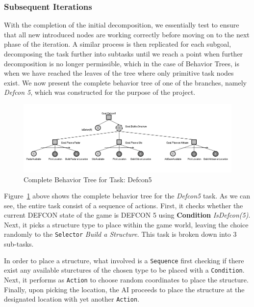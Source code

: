        \subsubsection{Subsequent Iterations}
        
        With the completion of the initial decomposition, we essentially test to ensure that all new introduced nodes are working correctly before moving on to the next phase of the iteration. A similar process is then replicated for each subgoal, decomposing the task further into subtasks until we reach a point when further decomposition is no longer permissible, which in the case of Behavior Trees, is when we have reached the leaves of the tree where only primitive task nodes exist. We now present the complete behavior tree of one of the branches, namely \emph{Defcon 5}, which was constructed for the purpose of the project. 
        
        \pagebreak
        
        \begin{figure}[h]                
            \begin{center}
            \includegraphics[scale=0.45]{images/defcon5.png}
            \caption{Complete Behavior Tree for Task: Defcon5}
            \label{img:defcon5}
            \end{center}            
        \end{figure}
        
        Figure~\ref{img:defcon5} above shows the complete behavior tree for the \emph{Defcon5} task. As we can see, the entire task consist of a sequence of actions. First, it checks whether the current DEFCON state of the game is DEFCON 5 using \textbf{Condition} \emph{IsDefcon(5)}. Next, it picks a structure type to place within the game world, leaving the choice randomly to the \texttt{Selector} \emph{Build a Structure}. This task is broken down into 3 sub-tasks.
        
        In order to place a structure, what involved is a \texttt{Sequence} first checking if there exist any available sturctures of the chosen type to be placed with a \texttt{Condition}. Next, it performs as \texttt{Action} to choose random coordinates to place the structure. Finally, upon picking the location, the AI proceeds to place the structure at the designated location with yet another \texttt{Action}.
        
